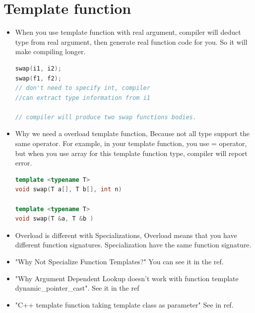 \documentclass[a4paper,12pt,twoside]{book}
\begin{document}
\section{Template function}
\begin{itemize}
\item When you use template function with real argument, compiler will deduct type from real argument, then generate real function code for you.  So it will make compiling longer.
\begin{lstlisting}[frame=single, language=c++]
swap(i1, i2);
swap(f1, f2);
// don't need to specify int, compiler
//can extract type information from i1

// compiler will produce two swap functions bodies.
\end{lstlisting}

\item Why we need a overload template function, Because not all type support the same operator. For example, in your template function, you use = operator, but when you use array for this template function type, compiler will report error.
\begin{lstlisting}[frame=single, language=c++]
template <typename T>
void swap(T a[], T b[], int n)

template <typename T>
void swap(T &a, T &b )
\end{lstlisting}

\item Overload is different with Specializations, Overload means that you have different function signatures. Specialization have the same function signature.

\item "Why Not Specialize Function Templates?" You can see it in the ref.

\item "Why Argument Dependent Lookup doesn't work with function template dynamic\_pointer\_cast". See it in the ref

\item "C++ template function taking template class as parameter" See in ref.
\end{itemize}
\end{document}
